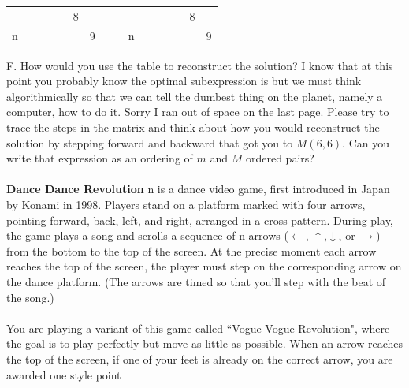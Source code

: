 \documentclass[12pt]{article}
\begin{document}
\begin{table}[]
\begin{tabular}{llllllllllllllll}
    \multicolumn{1}{l|}{}  & \multicolumn{1}{l|}{}  & \multicolumn{1}{l|}{}  & \multicolumn{1}{l|}{}    & \multicolumn{1}{l|}{}  & \multicolumn{1}{l|}{8} & \multicolumn{1}{l|}{}  &  &  & \multicolumn{1}{l|}{}  & \multicolumn{1}{l|}{}  & \multicolumn{1}{l|}{}  & \multicolumn{1}{l|}{}  & \multicolumn{1}{l|}{}  & \multicolumn{1}{l|}{8} & \multicolumn{1}{l|}{}  \\ \cline{2-7} \cline{11-16} 
    \multicolumn{1}{l|}{n} & \multicolumn{1}{l|}{}  & \multicolumn{1}{l|}{}  & \multicolumn{1}{l|}{}    & \multicolumn{1}{l|}{}  & \multicolumn{1}{l|}{}  & \multicolumn{1}{l|}{9} &  &  & \multicolumn{1}{l|}{n} & \multicolumn{1}{l|}{}  & \multicolumn{1}{l|}{}  & \multicolumn{1}{l|}{}  & \multicolumn{1}{l|}{}  & \multicolumn{1}{l|}{}  & \multicolumn{1}{l|}{9} \\ \cline{2-7} \cline{11-16} 
    \end{tabular}
    \end{table}
    \FloatBarrier
\newpage
\noindent F. How would you use the table to reconstruct the solution? I know that at this
point you probably know the optimal subexpression is but we must think algorithmically
so that we can tell the dumbest thing on the planet, namely a computer, how to
do it. Sorry I ran out of space on the last page. Please try to trace the steps in the matrix
and think about how you would reconstruct the solution by stepping forward and backward that got you
to $M(6,6)$. Can you write that expression as an ordering of $m$ and $M$ ordered pairs?\\\\
\newpage
\noindent \textbf{Dance Dance Revolution} n is a dance video game, 
first introduced in Japan by Konami in
1998. Players stand on a platform marked 
with four arrows, pointing forward, back, left,
and right, arranged in a cross pattern. 
During play, the game plays a song and scrolls a
sequence of n arrows ($\leftarrow$, $\uparrow$,$\downarrow$, or $\rightarrow$) from the 
bottom to the top of the screen. At the
precise moment each arrow reaches the top of the 
screen, the player must step on the
corresponding arrow on the dance platform. (The 
arrows are timed so that you’ll step with
the beat of the song.)\\\\
You are playing a variant of this game called ``Vogue Vogue Revolution", where the goal
is to play perfectly but move as little as possible. When an arrow reaches the top of the
screen, if one of your feet is already on the correct arrow, you are awarded one style point
\end{document}
